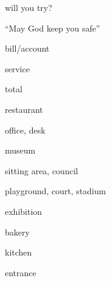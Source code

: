 \begin{flashcard}{\LARGE will you try?}
\LARGE {}
\end{flashcard}
\begin{flashcard}{\LARGE ``May God keep you safe''}
\LARGE {}
\end{flashcard}
\begin{flashcard}{\LARGE bill/account}
\LARGE {}
\end{flashcard}
\begin{flashcard}{\LARGE service}
\LARGE {}
\end{flashcard}
\begin{flashcard}{\LARGE total}
\LARGE {}
\end{flashcard}
\begin{flashcard}{\LARGE restaurant}
\LARGE {}
\end{flashcard}
\begin{flashcard}{\LARGE office, desk}
\LARGE {}
\end{flashcard}
\begin{flashcard}{\LARGE museum}
\LARGE {}
\end{flashcard}
\begin{flashcard}{\LARGE sitting area, council}
\LARGE {}
\end{flashcard}
\begin{flashcard}{\LARGE playground, court, stadium}
\LARGE {}
\end{flashcard}
\begin{flashcard}{\LARGE exhibition}
\LARGE {}
\end{flashcard}
\begin{flashcard}{\LARGE bakery}
\LARGE {}
\end{flashcard}
\begin{flashcard}{\LARGE kitchen}
\LARGE {}
\end{flashcard}
\begin{flashcard}{\LARGE entrance}
\LARGE {}
\end{flashcard}
